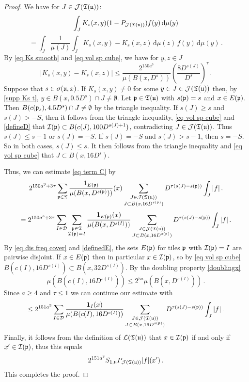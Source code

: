 \begin{proof}
    We have for $J \in \mathcal{J}(\mathfrak T(\mathfrak u))$:
    $$
        \int_J K_{s}(x,y)(1 - P_{\mathcal{J}(\mathfrak T(\mathfrak u))})f(y) \, \mathrm{d}\mu(y)
    $$
    \begin{equation}
    \label{eq canc comp}
        =  \int_J \frac{1}{\mu(J)} \int_J K_s(x,y) - K_s(x,z) \, \mathrm{d}\mu(z) \,f(y) \, \mathrm{d}\mu(y)\,.
    \end{equation}
    By \eqref{eq Ks smooth} and \eqref{eq vol sp cube}, we have for $y, z \in J$
    $$
        |K_s(x,y) - K_s(x,z)| \le \frac{2^{150a^3}}{\mu(B(x, D^s))} \left(\frac{8 D^{s(J)}}{D^s}\right)^\tau\,.
    $$
    Suppose that $s \in \sigma(\mathfrak u, x)$.
    If $K_s(x,y) \ne 0$ for some $y \in J \in \mathcal{J}(\mathfrak T(\mathfrak u))$ then, by \eqref{supp Ks t}, $y \in B(x, 0.5 D^s) \cap J \ne \emptyset$. Let $\mathfrak p \in \mathfrak T(\mathfrak u)$ with $s(\mathfrak p) = s$ and $x \in E(\mathfrak p)$. Then $B(c(\mathfrak p_s), 4.5D^s) \cap J \ne \emptyset$ by the triangle inequality. If $s(J) \ge s$ and $s(J) > -S$, then it follows from the triangle inequality, \eqref{eq vol sp cube} and \eqref{defineD} that $\mathcal{I}(\mathfrak p) \subset B(c(J), 100 D^{s(J)+1})$, contradicting $J \in \mathcal{J}(\mathfrak{T}(\mathfrak u))$. Thus $s(J) \le s - 1$ or $s(J) = -S$. If $s(J) = -S$ and $s(J) > s - 1$, then $s = -S$. So in both cases, $s(J) \le s$. It then follows from the triangle inequality and \eqref{eq vol sp cube} that $J \subset B(x, 16 D^s)$.

    Thus, we can estimate \eqref{eq term C} by
    $$
        2^{150a^3 + 3\tau}\sum_{\mathfrak p\in \mathfrak{T}}\frac{\mathbf{1}_{E(\mathfrak p)}}{\mu(B(x,D^{s(\mathfrak p)}))}(x)\sum_{\substack{J\in \mathcal{J}(\mathfrak T(\mathfrak u))\\J\subset B(x,  16D^{s(\mathfrak p)})}}  D^{\tau(s(J) - s(\mathfrak p))} \int_J |f|\,.
    $$
    $$
        = 2^{150a^3 + 3\tau}\sum_{I \in \mathcal{D}} \sum_{\substack{\mathfrak p\in \mathfrak{T}\\ \mathcal{I}(\mathfrak p) = I}}\frac{\mathbf{1}_{E(\mathfrak p)}(x)}{\mu(B(x, D^{s(I)}))}\sum_{\substack{J\in \mathcal{J}(\mathfrak T(\mathfrak u))\\J\subset B(x,  16 D^{s(\mathfrak p)})}}  D^{\tau(s(J) - s(\mathfrak p))} \int_J |f|\,.
    $$
    By \eqref{eq dis freq cover} and \eqref{definedE}, the sets $E(\mathfrak p)$ for tiles $\mathfrak p$ with $\mathcal{I}(\mathfrak p) = I$ are pairwise disjoint.
    If $x \in E(\mathfrak p)$ then in particular $x \in \mathcal{I}(\mathfrak p)$, so by \eqref{eq vol sp cube} $B(c(I),16D^{s(I)}) \subset B(x, 32D^{s(I)})$. By the doubling property \eqref{doublingx}
    $$
        \mu(B(c(I), 16D^{s(I)})) \le 2^{5a} \mu(B(x, D^{s(I)}))\,.
    $$
    Since $a \ge 4$ and $\tau \le 1$ we can continue our estimate with
    $$
        \le 2^{151a^3}\sum_{I \in \mathcal{D}} \frac{\mathbf{1}_{I}(x)}{\mu(B(c(I),  16D^{s(I)}))}\sum_{\substack{J\in \mathcal{J}(\mathfrak T(\mathfrak u))\\J\subset B(x,  16 D^{s(\mathfrak p)})}}  D^{\tau(s(J) - s(\mathfrak p))} \int_J |f|\,.
    $$
    Finally, it follows from the definition of $\mathcal{L}(\mathfrak T(\mathfrak u))$ that $x \in \mathcal{I}(\mathfrak p)$ if and only if $x' \in \mathcal{I}(\mathfrak p)$, thus this equals
    $$
            2^{151a^3} S_{1,\mathfrak u} P_{\mathcal{J}(\mathfrak T(\mathfrak u))}|f|(x')\,.
    $$
    This completes the proof.
\end{proof}

